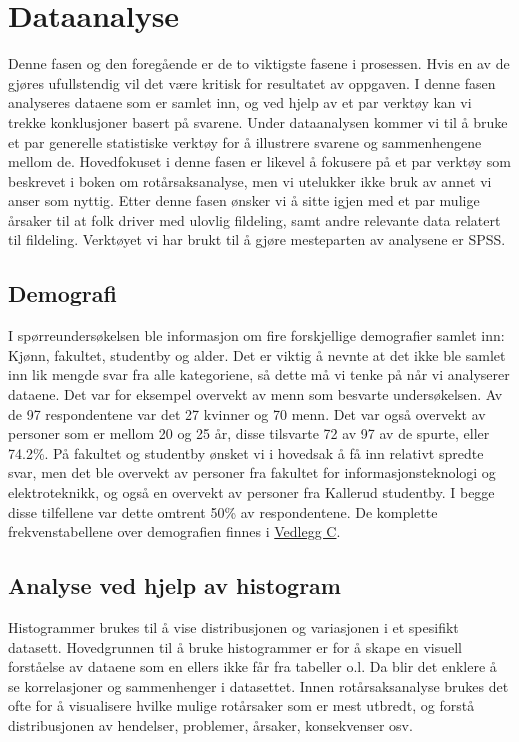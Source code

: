 \chapter{Dataanalyse}
Denne fasen og den foregående er de to viktigste fasene i prosessen. Hvis en av de gjøres ufullstendig vil det være kritisk for resultatet av oppgaven. I denne fasen analyseres dataene som er samlet inn, og ved hjelp av et par verktøy kan vi trekke konklusjoner basert på svarene. Under dataanalysen kommer vi til å bruke et par generelle statistiske verktøy for å illustrere svarene og sammenhengene mellom de. Hovedfokuset i denne fasen er likevel å fokusere på et par verktøy som beskrevet i boken om rotårsaksanalyse, men vi utelukker ikke bruk av annet vi anser som nyttig. Etter denne fasen ønsker vi å sitte igjen med et par mulige årsaker til at folk driver med ulovlig fildeling, samt andre relevante data relatert til fildeling. Verktøyet vi har brukt til å gjøre mesteparten av analysene er SPSS. 

\section{Demografi}
I spørreundersøkelsen ble informasjon om fire forskjellige demografier samlet inn: Kjønn, fakultet, studentby og alder. Det er viktig å nevnte at det ikke ble samlet inn lik mengde svar fra alle kategoriene, så dette må vi tenke på når vi analyserer dataene. Det var for eksempel overvekt av menn som besvarte undersøkelsen. Av de 97 respondentene var det 27 kvinner og 70 menn. Det var også overvekt av personer som er mellom 20 og 25 år, disse tilsvarte 72 av 97 av de spurte, eller 74.2\%. På fakultet og studentby ønsket vi i hovedsak å få inn relativt spredte svar, men det ble overvekt av personer fra fakultet for informasjonsteknologi og elektroteknikk, og også en overvekt av personer fra Kallerud studentby. I begge disse tilfellene var dette omtrent 50\% av respondentene. De komplette frekvenstabellene over demografien finnes i \hyperref[frekvens]{Vedlegg C}.

\section{Analyse ved hjelp av histogram}
Histogrammer brukes til å vise distribusjonen og variasjonen i et spesifikt datasett. Hovedgrunnen til å bruke histogrammer er for å skape en visuell forståelse av dataene som en ellers ikke får fra tabeller o.l. Da blir det enklere å se korrelasjoner og sammenhenger i datasettet. Innen rotårsaksanalyse brukes det ofte for å visualisere hvilke mulige rotårsaker som er mest utbredt, og forstå distribusjonen av hendelser, problemer, årsaker, konsekvenser osv. \cite{RCA}

